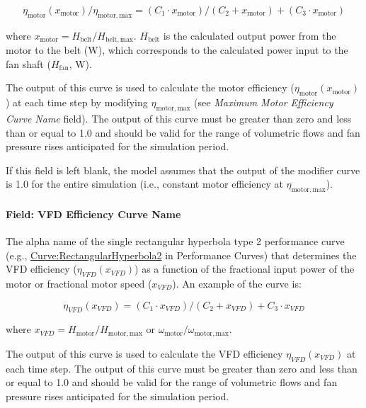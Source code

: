 \begin{equation}
  \eta_{\mathrm{motor}} (x_{\mathrm{motor}}) / \eta_{\mathrm{motor, max}} = (C_1 \cdot x_{\mathrm{motor}}) / (C_2 + x_{\mathrm{motor}}) + (C_3 \cdot x_{\mathrm{motor}})
\end{equation}

where \(x_{\mathrm{motor}} = H_{\mathrm{belt}} / H_{\mathrm{belt, max}}\). \(H_{\mathrm{belt}}\) is the calculated output power from the motor to the belt (W), which corresponds to the calculated power input to the fan shaft (\(H_{\mathrm{fan}}\), W).

  The output of this curve is used to calculate the motor efficiency (\(\eta_{\mathrm{motor}} (x_{\mathrm{motor}})\)) at each time step by modifying \(\eta_{\mathrm{motor, max}}\) (see \emph{Maximum Motor Efficiency Curve Name} field). The output of this curve must be greater than zero and less than or equal to 1.0 and should be valid for the range of volumetric flows and fan pressure rises anticipated for the simulation period.

If this field is left blank, the model assumes that the output of the modifier curve is 1.0 for the entire simulation (i.e., constant motor efficiency at \(\eta_{\mathrm{motor, max}}\)).

\paragraph{Field: VFD Efficiency Curve Name}\label{field-vfd-efficiency-curve-name}

The alpha name of the single rectangular hyperbola type 2 performance curve (e.g., \hyperref[curverectangularhyperbola2]{Curve:RectangularHyperbola2} in Performance Curves) that determines the VFD efficiency (\(\eta_{VFD}(x_{VFD})\)) as a function of the fractional input power of the motor or fractional motor speed (\(x_{VFD}\)). An example of the curve is:

\begin{equation}
  \eta_{VFD}(x_{VFD}) = (C_1 \cdot x_{VFD}) / (C_2 + x_{VFD}) + C_3 \cdot x_{VFD}
\end{equation}

where \(x_{VFD} = H_{\mathrm{motor}} / H_{\mathrm{motor, max}}\) or \(\omega_{\mathrm{motor}} / \omega_{\mathrm{motor, max}}\).

The output of this curve is used to calculate the VFD efficiency \(\eta_{VFD}(x_{VFD})\) at each time step. The output of this curve must be greater than zero and less than or equal to 1.0 and should be valid for the range of volumetric flows and fan pressure rises anticipated for the simulation period.

